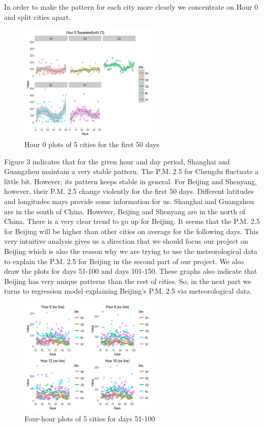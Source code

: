 \documentclass[11pt]{article} %
\begin{document}
In order to make the pattern for each city more clearly we concentrate on Hour 0 and split cities apart. 

\begin{figure}[!ht]
  \centering
    \includegraphics[width=0.6\textwidth]{Figure1-3}
      \caption{Hour 0 plots of 5 cities for the first 50 days}
\end{figure}

Figure 3 indicates that for the given hour and day period, Shanghai and Guangzhou maintain a very stable pattern. The P.M. 2.5 for Chengdu fluctuate a little bit. However, its pattern keeps stable in general. For Beijing and Shenyang, however, their P.M. 2.5 change violently for the first 50 days. Different latitudes and longitudes mays provide some information for us. Shanghai and Guangzhou are in the south of China. However, Beijing and Shenyang are in the north of China. 
	There is a very clear trend to go up for Beijing. It seems that the P.M. 2.5 for Beijing will be higher than other cities on average for the following days. This very intuitive analysis gives us a direction that we should focus our project on Beijing which is also the reason why we are trying to use the meteorological data to explain the P.M. 2.5 for Beijing in the second part of our project. 
	We also draw the plots for days 51-100 and days 101-150. These graphs also indicate that Beijing has very unique patterns than the rest of cities. So, in the next part we turns to regression model explaining Beijing’s P.M. 2.5 via meteorological data.
	
\begin{figure}[!ht]
  \centering
    \includegraphics[width=0.6\textwidth]{Figure1-4}
      \caption{Four-hour plots of 5 cities for days 51-100}
\end{figure}
\end{document}
